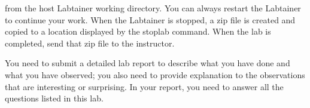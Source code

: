 from the host Labtainer working directory.  You can always restart the
Labtainer to continue your work.  When the Labtainer is stopped, a
zip file is created and copied to a location displayed by the stoplab
command.  When the lab is completed, send that zip file to the instructor.

You need to submit a detailed lab report to describe what you have
done and what you have observed; you also need to provide explanation
to the observations that are interesting or surprising. In your report,
you need to answer all the questions listed in this lab.







